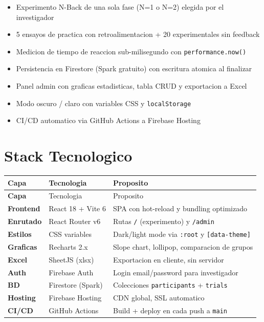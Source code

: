 \documentclass[12pt,a4paper]{article}
\begin{document}
\begin{tcolorbox}[infobox, title={Caracteristicas principales}]
\begin{itemize}[leftmargin=1em]
  \item Experimento N-Back de una sola fase (N=1 o N=2) elegida por el investigador
  \item 5 ensayos de practica con retroalimentacion + 20 experimentales sin feedback
  \item Medicion de tiempo de reaccion sub-milisegundo con \texttt{performance.now()}
  \item Persistencia en Firestore (Spark gratuito) con escritura atomica al finalizar
  \item Panel admin con graficas estadisticas, tabla CRUD y exportacion a Excel
  \item Modo oscuro / claro con variables CSS y \texttt{localStorage}
  \item CI/CD automatico via GitHub Actions a Firebase Hosting
\end{itemize}
\end{tcolorbox}

\section{Stack Tecnologico}

\begin{longtable}{>{\bfseries}p{3.5cm} p{4.8cm} p{4.8cm}}
\toprule
Capa & Tecnologia & Proposito \\
\midrule
\endfirsthead
\toprule
Capa & Tecnologia & Proposito \\
\midrule
\endhead
\bottomrule
\endfoot
Frontend  & React 18 + Vite 6   & SPA con hot-reload y bundling optimizado \\
Enrutado  & React Router v6     & Rutas \texttt{/} (experimento) y \texttt{/admin} \\
Estilos   & CSS variables       & Dark/light mode via \texttt{:root} y \texttt{[data-theme]} \\
Graficas  & Recharts 2.x        & Slope chart, lollipop, comparacion de grupos \\
Excel     & SheetJS (xlsx)      & Exportacion en cliente, sin servidor \\
Auth      & Firebase Auth       & Login email/password para investigador \\
BD        & Firestore (Spark)   & Colecciones \texttt{participants} + \texttt{trials} \\
Hosting   & Firebase Hosting    & CDN global, SSL automatico \\
CI/CD     & GitHub Actions      & Build + deploy en cada push a \texttt{main} \\
\bottomrule
\end{longtable}
\end{document}
